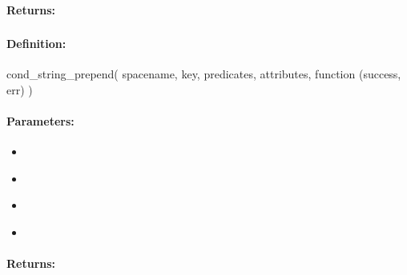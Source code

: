 \paragraph{Returns:}


\pagebreak
\subsubsection{}
\label{api:nodejs:cond_string_prepend}


\paragraph{Definition:}
\begin{javascriptcode}
cond_string_prepend(
        spacename, key, predicates, attributes, function (success, err) {})
\end{javascriptcode}
\paragraph{Parameters:}
\begin{itemize}[noitemsep]
\item {}\\

\item {}\\

\item {}\\

\item {}\\

\end{itemize}

\paragraph{Returns:}


\pagebreak
\subsubsection{}
\label{api:nodejs:string_append}



